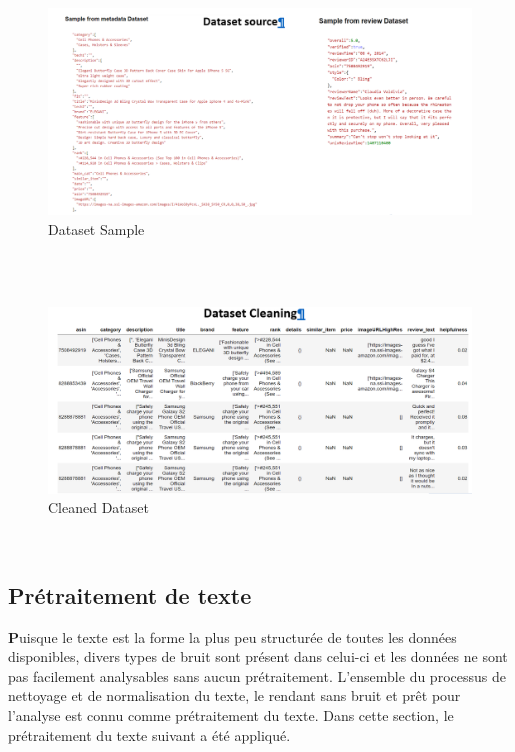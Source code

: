 \begin{figure}[!htb] 
\begin{center} 
\includegraphics[scale=0.55]{pics/screens/6.png}
\end{center} 
\caption{Dataset Sample} 
\end{figure}  \FloatBarrier
\\
\\
\begin{figure}[!htb] 
\begin{center} 
\includegraphics[scale=.6]{pics/screens/7.png}
\end{center} 
\caption{Cleaned Dataset} 
\end{figure}  \FloatBarrier
\\
\subsection{Prétraitement de texte  }

\textbf Puisque le texte est la forme la plus peu structurée de toutes les données disponibles, divers types de bruit sont
présent dans celui-ci et les données ne sont pas facilement analysables sans aucun prétraitement. L’ensemble du processus
de nettoyage et de normalisation du texte, le rendant sans bruit et prêt pour l’analyse est connu comme
prétraitement du texte. Dans cette section, le prétraitement du texte suivant a été appliqué.

